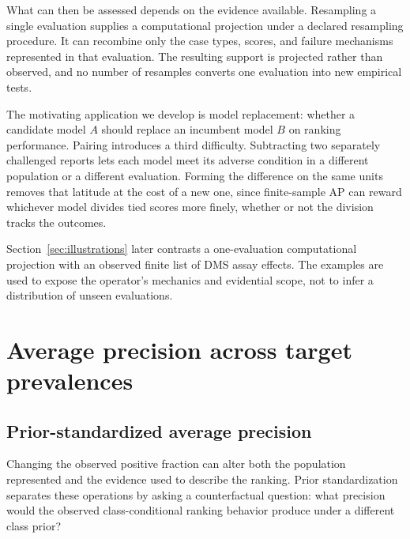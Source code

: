 \documentclass[11pt]{article}
\theoremstyle{remark}
\begin{document}
What can then be assessed depends on the evidence available. Resampling a
single evaluation supplies a computational projection under a declared
resampling procedure. It can recombine only the case types, scores, and failure
mechanisms represented in that evaluation. The resulting support is projected rather than observed, and no
number of resamples converts one evaluation into new empirical tests.

The motivating application we develop is model replacement: whether a candidate
model $A$ should replace an incumbent model $B$ on ranking performance. Pairing
introduces a third difficulty. Subtracting two separately challenged reports
lets each model meet its adverse condition in a different population or a
different evaluation. Forming the difference on the same units removes that
latitude at the cost of a new one, since finite-sample AP can reward whichever
model divides tied scores more finely, whether or not the division tracks the
outcomes.

Section~\ref{sec:illustrations} later contrasts a one-evaluation computational
projection with an observed finite list of DMS assay effects. The examples are
used to expose the operator's mechanics and evidential scope, not to infer a
distribution of unseen evaluations.


\section{Average precision across target prevalences}
\label{sec:prevalence}

\subsection{Prior-standardized average precision}

Changing the observed positive fraction can alter both the population represented and the evidence used to describe the ranking. Prior standardization separates these operations by asking a counterfactual question: what precision would the observed class-conditional ranking behavior produce under a different class prior?
\end{document}
